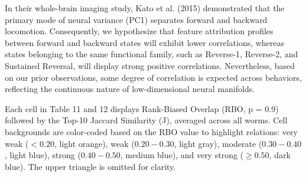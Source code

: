 \documentclass{article}
\begin{document}
In their whole-brain imaging study, Kato et al. (2015) \cite{kato2015global} demonstrated
that the primary mode of neural variance (PC1) separates forward and backward locomotion.
Consequently, we hypothesize that feature attribution profiles between forward and backward
states will exhibit lower correlations, whereas states belonging to the same functional
family, such as Reverse-1, Reverse-2, and Sustained Reversal, will display strong positive correlations.
Nevertheless, based on our prior observations, some degree of
correlation is expected across behaviors, reflecting the continuous nature of low-dimensional neural manifolds. 

Each cell in Table 11 and 12 displays Rank-Biased Overlap
(RBO, p = 0.9) followed by the Top-10 Jaccard Similarity (J), averaged across all worms.
Cell backgrounds are color-coded based on the RBO value to highlight relations: very weak ($<0.20$, light orange),
weak ($0.20-0.30$, light gray), moderate ($0.30-0.40$, light blue),
strong ($0.40-0.50$, medium blue), and very strong ($\ge0.50$, dark blue).
The upper triangle is omitted for clarity.
   


\newcommand{\cval}[3]{\cellcolor{#1} #2 $\mid$ J: #3}
\newcommand{\cdiag}{\cellcolor{diag} 1.00}
\end{document}
